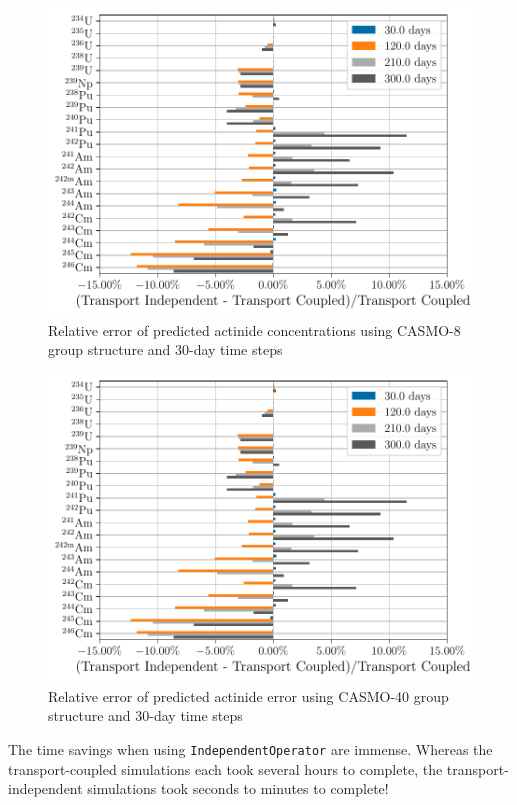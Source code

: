     \begin{figure}[h!tpb]
        \centering
        \includegraphics[width=\linewidth]{figs/actinides_casmo8_constant_xs_predictor_fission_q_months.pdf}
        \caption[]{Relative error of predicted actinide concentrations using
        CASMO-8 group structure and 30-day time steps}
        \label{fig:actinides-error-casmo8-xs-months}
    \end{figure}

    \begin{figure}[h!tpb]
        \centering
        \includegraphics[width=\linewidth]{figs/actinides_casmo40_constant_xs_predictor_fission_q_months.pdf}
        \caption{Relative error of predicted actinide error using
        CASMO-40 group structure and 30-day time steps}
        \label{fig:actinides-error-casmo40-xs-months}
    \end{figure}


    The time savings when using \verb.IndependentOperator. are immense. Whereas
    the transport-coupled simulations each took several hours to complete, the
    transport-independent simulations took seconds to minutes to complete!

